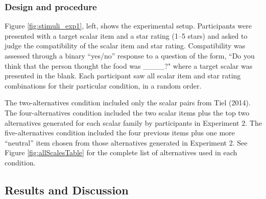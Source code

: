 \documentclass[10pt, letterpaper]{article}
\begin{document}
\subsubsection{Design and procedure}\label{design-and-procedure}

Figure \ref{fig:stimuli_exp1}, left, shows the experimental setup.
Participants were presented with a target scalar item and a star rating
(1--5 stars) and asked to judge the compatibility of the scalar item and
star rating. Compatibility was assessed through a binary ``yes/no''
response to a question of the form, ``Do you think that the person
thought the food was \_\_\_\_?" where a target scalar was presented in
the blank. Each participant saw all scalar item and star rating
combinations for their particular condition, in a random order.

The two-alternatives condition included only the scalar pairs from Tiel
(2014). The four-alternatives condition included the two scalar items
plus the top two alternatives generated for each scalar family by
participants in Experiment 2. The five-alternatives condition included
the four previous items plus one more ``neutral'' item chosen from those
alternatives generated in Experiment 2. See Figure
\ref{fig:allScalesTable} for the complete list of alternatives used in
each condition.

\subsection{Results and Discussion}\label{results-and-discussion}
\end{document}
